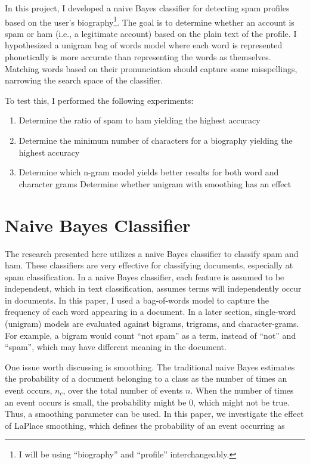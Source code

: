 \documentclass[10pt]{article}
\begin{document}
In this project, I developed a naive Bayes classifier for detecting spam
profiles based on the user's biography\footnote{I will be using ``biography''
  and ``profile'' interchangeably.}. The goal is to determine whether
an account is spam or ham (i.e., a legitimate account) based on the plain text
of the profile. I hypothesized a unigram bag of words model where each word is
represented phonetically is more accurate than representing the words as
themselves. Matching words based on their pronunciation should capture some
misspellings, narrowing the search space of the classifier.

  To test this, I performed the following experiments:

\begin{enumerate}
  \item Determine the ratio of spam to ham yielding the highest accuracy
  \item Determine the minimum number of characters for a biography yielding
    the highest accuracy
  \item Determine which n-gram model yields better results for both word and
    character grams
    Determine whether unigram with smoothing has an effect
\end{enumerate}

\section{Naive Bayes Classifier}
The research presented here utilizes a naive Bayes classifier to classify spam
and ham. These classifiers are very effective for classifying
documents\cite[p182]{mitchell}, especially at spam
classification\cite{which-nb}. In a naive Bayes classifier, each feature is
assumed to be independent, which in text classification, assumes terms will
independently occur in documents. In this paper, I used a bag-of-words model
to capture the frequency of each word appearing in a document. In a later
section, single-word (unigram) models are evaluated against bigrams, trigrams,
and character-grams. For example, a bigram would count ``not spam'' as a term,
instead of ``not'' and ``spam'', which may have different meaning in the
document.

One issue worth discussing is smoothing. The traditional naive Bayes estimates
the probability of a document belonging to a class as the number of times an
event occurs, $n_c$, over the total number of events $n$. When the number of
times an event occurs is small, the probability might be 0, which might not be
true. Thus, a smoothing parameter can be used. In this paper, we investigate
the effect of LaPlace smoothing, which defines the probability of an event
occurring as
\end{document}

